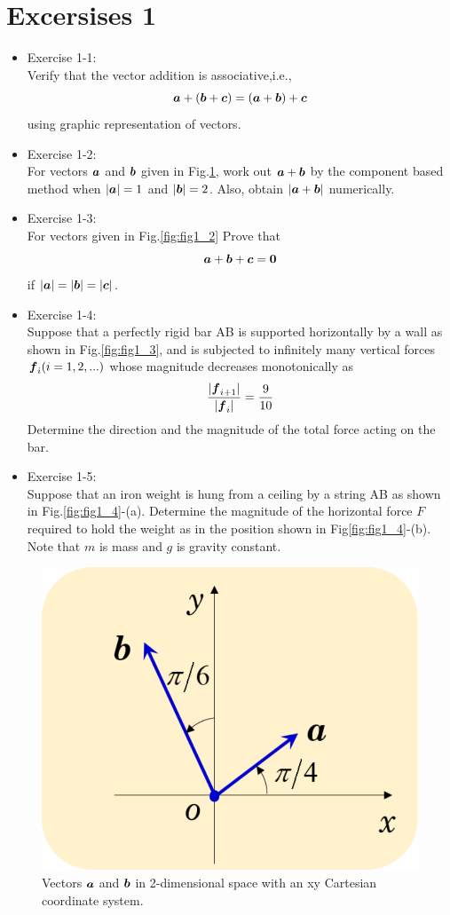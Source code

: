 \documentclass[10pt,a4j]{article}
\begin{document}
\section*{Excersises 1}
\begin{itemize}
\item
Exercise 1-1:\\
Verify that the vector addition is associative,i.e., 
\[
	\mbox{\boldmath $a$}+(\mbox{\boldmath $b$}+\mbox{\boldmath $c$})=
		(\mbox{\boldmath $a$}+\mbox{\boldmath $b$})+\mbox{\boldmath $c$}
\]
using graphic representation of vectors. 
\item
Exercise 1-2:\\
For vectors $\mbox{\boldmath $a$}$ and $\mbox{\boldmath $b$}$ given in Fig.\ref{fig:fig1_1}, 
work out $\mbox{\boldmath $a$}+\mbox{\boldmath $b$}$ by the component based 
		method when  $|\mbox{\boldmath $a$}|=1$ and $|\mbox{\boldmath $b$}|=2$.
		Also, obtain $|\mbox{\boldmath $a$}+\mbox{\boldmath $b$}|$ numerically.
\item
Exercise 1-3:\\
		For vectors given in Fig.\ref{fig:fig1_2} Prove that 
	\[
		\mbox{\boldmath $a$}+\mbox{\boldmath $b$}+\mbox{\boldmath $c$}=\mbox{\boldmath $0$}
	\]
		if $|\mbox{\boldmath $a$}|=|\mbox{\boldmath $b$}|=|\mbox{\boldmath $c$}|$.
\item
Exercise 1-4:\\
Suppose that a perfectly rigid bar AB is supported horizontally by a wall
 as shown in Fig.\ref{fig:fig1_3}, and is subjected to infinitely many 
vertical forces $\mbox{\boldmath $f$}_i (i=1,2,...)$ whose magnitude decreases monotonically as 
\[
 \frac{
	|\mbox{\boldmath $f$}_{i+1}|
	}{
	|\mbox{\boldmath $f$}_i|
}
	=\frac{9}{10} 
\]
Determine the direction and the magnitude of the total force acting on the bar. 
\item
Exercise 1-5:\\
	Suppose that an iron weight is hung from a ceiling by a string AB as shown in Fig.\ref{fig:fig1_4}-(a). 
	Determine the magnitude of the horizontal force $F$ required to hold the weight as 
	in the position shown in Fig\ref{fig:fig1_4}-(b).
	Note that $m$ is mass and $g$ is gravity constant.  
\end{itemize}
\begin{figure}[h]
	\begin{center}
	\includegraphics[width=0.4\linewidth]{fig1_1.eps} 
	\end{center}
	\caption{Vectors $\mbox{\boldmath $a$}$ and $\mbox{\boldmath $b$}$ in 2-dimensional space with an
	xy Cartesian coordinate system.}
	\label{fig:fig1_1}
\end{figure}
\end{document}
